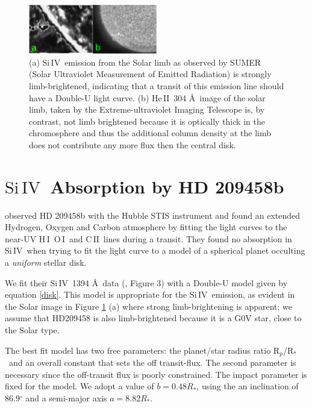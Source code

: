 \documentclass[twocolumn]{emulateapj}
\newcommand{\cii}{\ensuremath{\mathrm{C}\,\scriptstyle \mathrm{II}}}
\newcommand{\oi}{\ensuremath{\mathrm{O}\,\scriptstyle \mathrm{I}}}
\newcommand{\hi}{\ensuremath{\mathrm{H}\,\scriptstyle \mathrm{I}}}
\newcommand{\heII}{\ensuremath{\mathrm{He}\,\scriptstyle \mathrm{II}}}
\newcommand{\siIV}{\ensuremath{\mathrm{Si}\,\scriptstyle \mathrm{IV}}}
\newcommand{\p}{R$_p$/R$_*$}
\begin{document}
\begin{figure}
\begin{center}
\includegraphics[width=0.5\textwidth]{limb_compare_siIV_heII.eps}
\caption{(a) \siIV\ emission from the Solar limb as observed by SUMER (Solar Ultraviolet Measurement of Emitted Radiation) \citep{wiik} is strongly limb-brightened, indicating that a transit of this emission line should have a Double-U light curve. (b) \heII\ 304 \AA\ image of the solar limb, taken by the Extreme-ultraviolet Imaging Telescope \citep{feldman} is, by contrast, not limb brightened because it is optically thick in the chromosphere and thus the additional column density at the limb does not contribute any more flux then the central disk.}
\label{limbs}
\end{center}
\end{figure}

\section{\siIV\ Absorption by HD 209458b} \label{osiris}

\citet{viddisc} observed HD 209458b with the Hubble STIS instrument and found
an extended Hydrogen, Oxygen and Carbon atmosphere by fitting the light curves
to the near-UV \hi\, \oi\ and \cii\ lines during a transit. They found no absorption in \siIV\ when trying to fit the light curve to a model of a spherical planet occulting a {\it uniform} stellar disk.

We fit their \siIV\ 1394 \AA\ data (\citet{vidmad}, Figure 3) with a Double-U model given by equation \ref{disk}. This model is appropriate for the \siIV\ emission, as evident in the Solar image in Figure \ref{limbs} (a) where strong limb-brightening is apparent; we assume that HD209458 is also limb-brightened because it is a G0V star, close to the Solar type.

The best fit model has two free parameters: the planet/star radius ratio \p\ and an overall constant that sets the off transit-flux. The second parameter is necessary since the off-transit flux is poorly constrained. The impact parameter 
 is fixed for the model. We adopt a value of $ b= 0.48 R_*$, using the an inclination of 86.9$^\circ$ \citep{knutsonprop} and a semi-major axis $a=8.82 R_*$.
\end{document}
